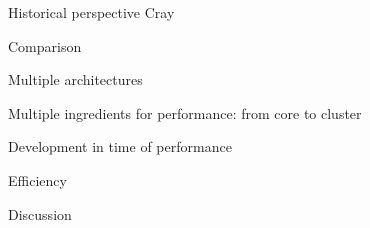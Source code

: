 
Historical perspective Cray

Comparison

Multiple architectures

Multiple ingredients for performance: from core to cluster

Development in time of performance

Efficiency

Discussion

